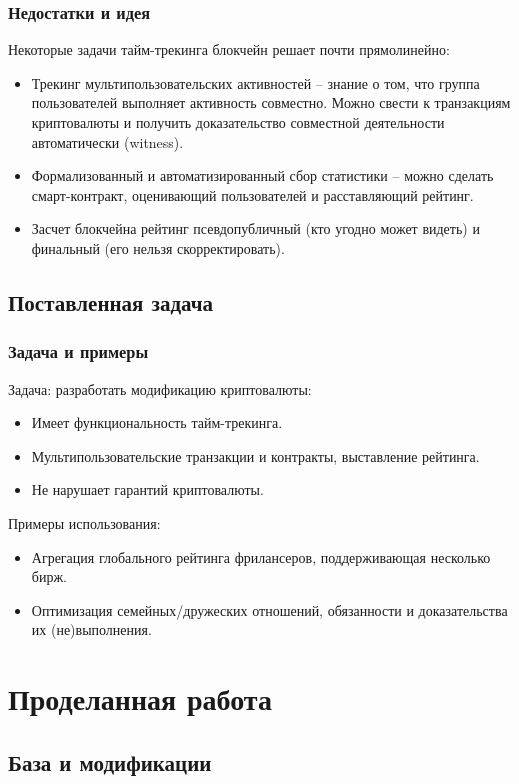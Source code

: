 \documentclass[11pt,handout,pdf,hyperref={unicode}]{beamer}
\begin{document}
\begin{frame}
  \frametitle{Недостатки и идея}

  Некоторые задачи тайм-трекинга блокчейн решает почти прямолинейно:
  \begin{itemize}
  \item Трекинг мультипользовательских активностей -- знание о том,
    что группа пользователей выполняет активность совместно. Можно
    свести к транзакциям криптовалюты и получить доказательство
    совместной деятельности автоматически (witness).
  \item Формализованный и автоматизированный сбор статистики -- можно
    сделать смарт-контракт, оценивающий пользователей и расставляющий
    рейтинг.
  \item Засчет блокчейна рейтинг псевдопубличный (кто угодно может
    видеть) и финальный (его нельзя скорректировать).
  \end{itemize}
\end{frame}

\subsection{Поставленная задача}

\begin{frame}
  \frametitle{Задача и примеры}
  Задача: разработать модификацию криптовалюты:
  \begin{itemize}
  \item Имеет функциональность тайм-трекинга.
  \item Мультипользовательские транзакции и контракты, выставление рейтинга.
  \item Не нарушает гарантий криптовалюты.
  \end{itemize}

  Примеры использования:
  \begin{itemize}
    \item Агрегация глобального рейтинга фрилансеров, поддерживающая
      несколько бирж.
    \item Оптимизация семейных/дружеских отношений, обязанности и
      доказательства их (не)выполнения.
  \end{itemize}
\end{frame}

\section{Проделанная работа}

\subsection{База и модификации}
\end{document}
